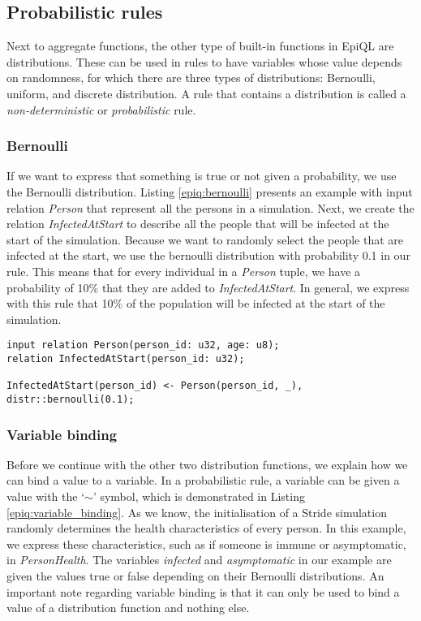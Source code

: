 \subsection{Probabilistic rules}
\label{subsec:probabilistic_rules}
Next to aggregate functions, the other type of built-in functions in EpiQL are distributions. These can be used in rules to have variables whose value depends on randomness, for which there are three types of distributions: Bernoulli, uniform, and discrete distribution. A rule that contains a distribution is called a \textit{non-deterministic} or \textit{probabilistic} rule.

\subsubsection{Bernoulli}
If we want to express that something is true or not given a probability, we use the Bernoulli distribution. Listing \ref{epiq:bernoulli} presents an example with input relation \textit{Person} that represent all the persons in a simulation. Next, we create the relation \textit{InfectedAtStart} to describe all the people that will be infected at the start of the simulation. Because we want to randomly select the people that are infected at the start, we use the bernoulli distribution with probability 0.1 in our rule. This means that for every individual in a \textit{Person} tuple, we have a probability of 10\% that they are added to \textit{InfectedAtStart}. In general, we express with this rule that 10\% of the population will be infected at the start of the simulation.

\begin{lstlisting}[caption={Bernoulli distribution.}, label={epiq:bernoulli}]
input relation Person(person_id: u32, age: u8);
relation InfectedAtStart(person_id: u32);

InfectedAtStart(person_id) <- Person(person_id, _), distr::bernoulli(0.1);
\end{lstlisting}

\subsubsection{Variable binding}
Before we continue with the other two distribution functions, we explain how we can bind a value to a variable. In a probabilistic rule, a variable can be given a value with the `$\sim$' symbol, which is demonstrated in Listing \ref{epiq:variable_binding}. As we know, the initialisation of a Stride simulation randomly determines the health characteristics of every person. In this example, we express these characteristics, such as if someone is immune or asymptomatic, in \textit{PersonHealth}. The variables \textit{infected} and \textit{asymptomatic} in our example are given the values true or false depending on their Bernoulli distributions. An important note regarding variable binding is that it can only be used to bind a value of a distribution function and nothing else.

